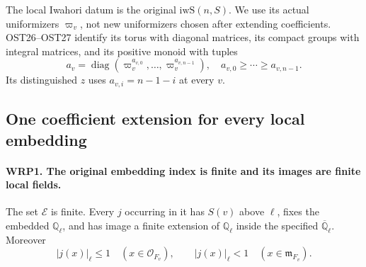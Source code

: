 The local Iwahori datum is the original $\mathrm{iwS}(n,S)$.
We use its actual uniformizers $\varpi_v$, not new uniformizers
chosen after extending coefficients.  OST26--OST27 identify its
torus with diagonal matrices, its compact groups with integral
matrices, and its positive monoid with tuples
\[
      a_v=\operatorname{diag}(\varpi_v^{a_{v,0}},\ldots,
                             \varpi_v^{a_{v,n-1}}),
                    \quad a_{v,0}\geq\cdots\geq a_{v,n-1}.
\]
Its distinguished $z$ uses $a_{v,i}=n-1-i$ at every $v$.

\subsection{One coefficient extension for every local embedding}

\paragraph{WRP1. The original embedding index is finite and its images are finite local fields.}
\label{claim:WRP1}
The set $\mathcal E$ is finite.  Every $j$ occurring in it has
$S(v)$ above $\ell$, fixes the embedded $\mathbb Q_\ell$, and
has image a finite extension of $\mathbb Q_\ell$ inside the
specified $\overline{\mathbb Q}_\ell$.  Moreover
\begin{equation}\label{eq:wrp-local-integrality}
 |j(x)|_\ell\leq1\quad(x\in\mathcal O_{F_v}),\qquad
 |j(x)|_\ell<1\quad(x\in\mathfrak m_{F_v}).
\end{equation}
